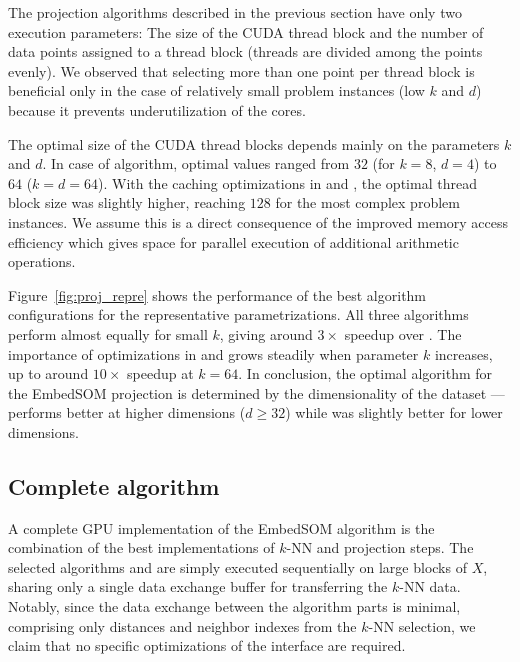 The projection algorithms described in the previous section have only two execution parameters:
The size of the CUDA thread block and the number of data points assigned to a thread block (threads are divided among the points evenly).
We observed that selecting more than one point per thread block is beneficial only in the case of relatively small problem instances (low $k$ and $d$) because it prevents underutilization of the cores.

The optimal size of the CUDA thread blocks depends mainly on the parameters $k$ and $d$.
In case of  algorithm, optimal values ranged from $32$ (for $k=8$, $d=4$) to $64$ ($k=d=64$).
With the caching optimizations in  and , the optimal thread block size was slightly higher, reaching $128$ for the most complex problem instances.
We assume this is a direct consequence of the improved memory access efficiency which gives space for parallel execution of additional arithmetic operations.

Figure~\ref{fig:proj_repre} shows the performance of the best algorithm configurations for the representative parametrizations.
All three algorithms perform almost equally for small $k$, giving around $3\times$ speedup over .
The importance of optimizations in  and  grows steadily when parameter $k$ increases, up to around $10\times$ speedup at $k=64$.
In conclusion, the optimal algorithm for the EmbedSOM projection is determined by the dimensionality of the dataset ---  performs better at higher dimensions ($d\geq32$) while  was slightly better for lower dimensions.


\subsection{Complete algorithm}\label{sec:impl-complete}

A complete GPU implementation of the EmbedSOM algorithm is the combination of the best implementations of $k$-NN and projection steps.
The selected algorithms  and  are simply executed sequentially on large blocks of $X$, sharing only a single data exchange buffer for transferring the $k$-NN data.
Notably, since the data exchange between the algorithm parts is minimal, comprising only distances and neighbor indexes from the $k$-NN selection, we claim that no specific optimizations of the interface are required.


